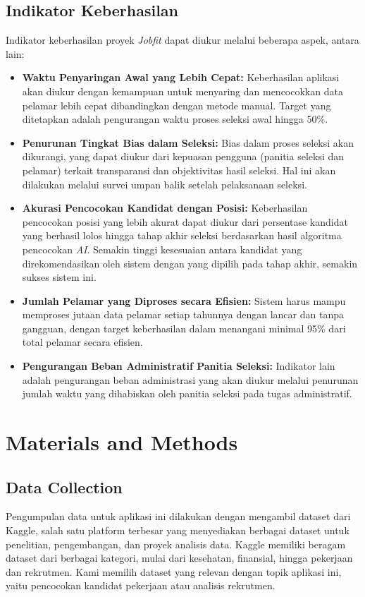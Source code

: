 \documentclass[journal,article,submit,pdftex,moreauthors]{Definitions/mdpi}
\begin{document}
\subsection{Indikator Keberhasilan}
Indikator keberhasilan proyek \textit{Jobfit} dapat diukur melalui beberapa aspek, antara lain:
\begin{itemize}[left=2em]
    \item \textbf{Waktu Penyaringan Awal yang Lebih Cepat:} Keberhasilan aplikasi akan diukur dengan kemampuan untuk menyaring dan mencocokkan data pelamar lebih cepat dibandingkan dengan metode manual. Target yang ditetapkan adalah pengurangan waktu proses seleksi awal hingga 50\%.
    \item \textbf{Penurunan Tingkat Bias dalam Seleksi:} Bias dalam proses seleksi akan dikurangi, yang dapat diukur dari kepuasan pengguna (panitia seleksi dan pelamar) terkait transparansi dan objektivitas hasil seleksi. Hal ini akan dilakukan melalui survei umpan balik setelah pelaksanaan seleksi.
    \item \textbf{Akurasi Pencocokan Kandidat dengan Posisi:} Keberhasilan pencocokan posisi yang lebih akurat dapat diukur dari persentase kandidat yang berhasil lolos hingga tahap akhir seleksi berdasarkan hasil algoritma pencocokan \textit{AI}. Semakin tinggi kesesuaian antara kandidat yang direkomendasikan oleh sistem dengan yang dipilih pada tahap akhir, semakin sukses sistem ini.
    \item \textbf{Jumlah Pelamar yang Diproses secara Efisien:} Sistem harus mampu memproses jutaan data pelamar setiap tahunnya dengan lancar dan tanpa gangguan, dengan target keberhasilan dalam menangani minimal 95\% dari total pelamar secara efisien.
    \item \textbf{Pengurangan Beban Administratif Panitia Seleksi:} Indikator lain adalah pengurangan beban administrasi yang akan diukur melalui penurunan jumlah waktu yang dihabiskan oleh panitia seleksi pada tugas administratif.
\end{itemize}

\section{Materials and Methods}
\subsection{Data Collection}
Pengumpulan data untuk aplikasi ini dilakukan dengan mengambil dataset dari Kaggle, salah satu platform terbesar yang menyediakan berbagai dataset untuk penelitian, pengembangan, dan proyek analisis data. Kaggle memiliki beragam dataset dari berbagai kategori, mulai dari kesehatan, finansial, hingga pekerjaan dan rekrutmen. Kami memilih dataset yang relevan dengan topik aplikasi ini, yaitu pencocokan kandidat pekerjaan atau analisis rekrutmen.
\end{document}

